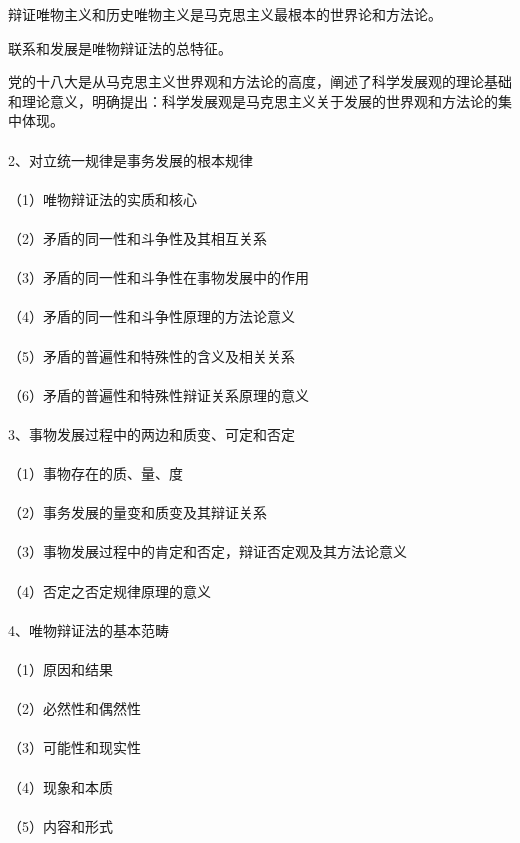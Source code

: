 \documentclass{ctexart}
\begin{document}
辩证唯物主义和历史唯物主义是马克思主义最根本的世界论和方法论。

联系和发展是唯物辩证法的总特征。

党的十八大是从马克思主义世界观和方法论的高度，阐述了科学发展观的理论基础和理论意义，明确提出：科学发展观是马克思主义关于发展的世界观和方法论的集中体现。
\\\\

2、对立统一规律是事务发展的根本规律
\\\\
（1）唯物辩证法的实质和核心
\\\\
（2）矛盾的同一性和斗争性及其相互关系
\\\\
（3）矛盾的同一性和斗争性在事物发展中的作用
\\\\
（4）矛盾的同一性和斗争性原理的方法论意义
\\\\
（5）矛盾的普遍性和特殊性的含义及相关关系
\\\\
（6）矛盾的普遍性和特殊性辩证关系原理的意义
\\\\

3、事物发展过程中的两边和质变、可定和否定
\\\\
（1）事物存在的质、量、度
\\\\
（2）事务发展的量变和质变及其辩证关系
\\\\
（3）事物发展过程中的肯定和否定，辩证否定观及其方法论意义
\\\\
（4）否定之否定规律原理的意义
\\\\

4、唯物辩证法的基本范畴
\\\\
（1）原因和结果
\\\\
（2）必然性和偶然性
\\\\
（3）可能性和现实性
\\\\
（4）现象和本质
\\\\
（5）内容和形式
\\\\
\end{document}
